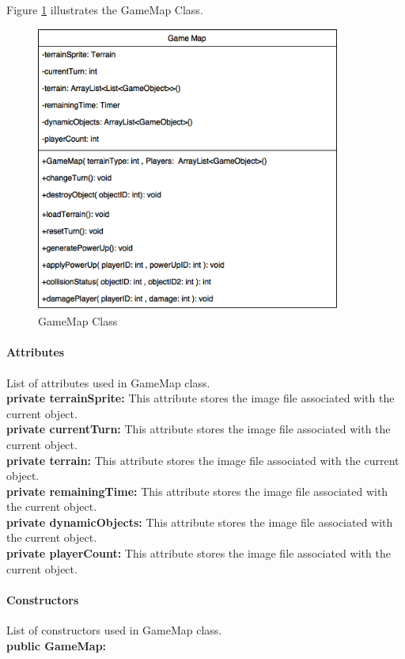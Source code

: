 \documentclass[12pt]{article} %
\begin{document}
Figure \ref{fig:gamemap} illustrates the GameMap Class.
\begin{figure}[h!]
   \centering
   \vspace{10pt}%
   \includegraphics[width=10cm]{gamemap.png}
   \caption{GameMap Class}
   \label{fig:gamemap}
\end{figure}

\paragraph{Attributes\\}

List of attributes used in GameMap class.\\
\textbf{private terrainSprite:} This attribute stores the image file associated with the current object.\\
\textbf{private currentTurn:} This attribute stores the image file associated with the current object.\\
\textbf{private terrain:} This attribute stores the image file associated with the current object.\\
\textbf{private remainingTime:} This attribute stores the image file associated with the current object.\\
\textbf{private dynamicObjects:} This attribute stores the image file associated with the current object.\\
\textbf{private playerCount:} This attribute stores the image file associated with the current object.

\paragraph{Constructors \\}
List of constructors used in GameMap class.\\
\textbf{public GameMap:} 
\end{document}
